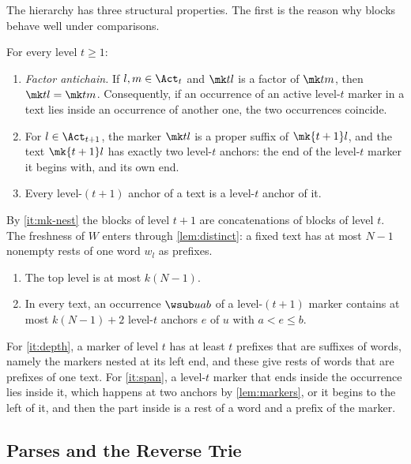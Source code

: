 The hierarchy has three structural properties. The first is the reason why
blocks behave well under comparisons.

\begin{lemma}[Markers]\label{lem:markers}
For every level $t\ge1$:
\begin{enumerate}
\item\label{it:mk-anti} \emph{Factor antichain.} If $l,m\in\Act_t$ and
  $\mk tl$ is a factor of $\mk tm$, then $\mk tl=\mk tm$. Consequently, if an
  occurrence of an active level-$t$ marker in a text lies inside an
  occurrence of another one, the two occurrences coincide.
\item\label{it:mk-two} For $l\in\Act_{t+1}$, the marker $\mk tl$ is a proper
  suffix of $\mk{t+1}l$, and the text $\mk{t+1}l$ has exactly two level-$t$
  anchors: the end of the level-$t$ marker it begins with, and its own end.
\item\label{it:mk-nest} Every level-$(t+1)$ anchor of a text is a level-$t$
  anchor of it.
\end{enumerate}
\end{lemma}

By \eqref{it:mk-nest} the blocks of level $t+1$ are concatenations of blocks
of level $t$. The freshness of $W$ enters through \cref{lem:distinct}: a
fixed text has at most $N-1$ nonempty rests of one word $w_l$ as prefixes.

\begin{lemma}\label{lem:depth-span}
\begin{enumerate}
\item\label{it:depth} The top level is at most $k(N-1)$.
\item\label{it:span} In every text, an occurrence $\wsub uab$ of a
  level-$(t+1)$ marker contains at most $k(N-1)+2$ level-$t$ anchors $e$ of
  $u$ with $a<e\le b$.
\end{enumerate}
\end{lemma}

For \eqref{it:depth}, a marker of level $t$ has at least $t$ prefixes that
are suffixes of words, namely the markers nested at its left end, and these
give rests of words that are prefixes of one text. For \eqref{it:span}, a
level-$t$ marker that ends inside the occurrence lies inside it, which
happens at two anchors by \cref{lem:markers}, or it begins to the left of
it, and then the part inside is a rest of a word and a prefix of the marker.

\subsection{Parses and the Reverse Trie}\label{sec:fresh-trie}

